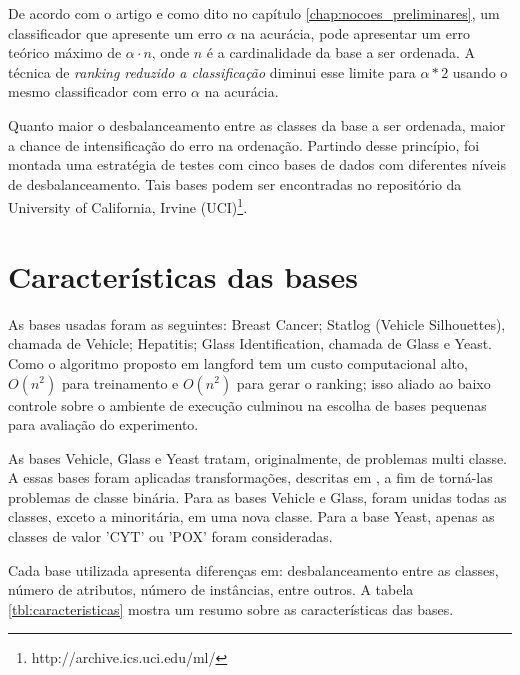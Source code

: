 De acordo com o artigo \cite{langford08} e como dito no capítulo \ref{chap:nocoes_preliminares}, um classificador que apresente um erro $\alpha$ na acurácia, pode apresentar um erro teórico máximo de $\alpha \cdot n$, onde $n$ é a cardinalidade da base a ser ordenada. A técnica de \emph{ranking reduzido a classificação} diminui esse limite para $\alpha * 2$ usando o mesmo classificador com erro $\alpha$ na acurácia.

Quanto maior o desbalanceamento entre as classes da base a ser ordenada, maior a chance de intensificação do erro na ordenação. Partindo desse princípio, foi montada uma estratégia de testes com cinco bases de dados com diferentes níveis de desbalanceamento. Tais bases podem ser encontradas no repositório da University of California, Irvine (UCI)\footnote{http://archive.ics.uci.edu/ml/}.

\section{Características das bases}

As bases usadas foram as seguintes: Breast Cancer; Statlog (Vehicle Silhouettes), chamada de Vehicle; Hepatitis; Glass Identification, chamada de Glass e Yeast. Como o algoritmo proposto em {{langford}} tem um custo computacional alto, $O(n^2)$ para treinamento e $O(n^2)$ para gerar o ranking; isso aliado ao baixo controle sobre o ambiente de execução culminou na escolha de bases pequenas para avaliação do experimento.

As bases Vehicle, Glass e Yeast tratam, originalmente, de problemas multi classe. A essas bases foram aplicadas transformações, descritas em \cite{guo04}, a fim de torná-las problemas de classe binária. Para as bases Vehicle e Glass, foram unidas todas as classes, exceto a minoritária, em uma nova classe. Para a base Yeast, apenas as classes de valor 'CYT' ou 'POX' foram consideradas.

Cada base utilizada apresenta diferenças em: desbalanceamento entre as classes, número de atributos, número de instâncias, entre outros. A tabela \ref{tbl:caracteristicas} mostra um resumo sobre as características das bases.

